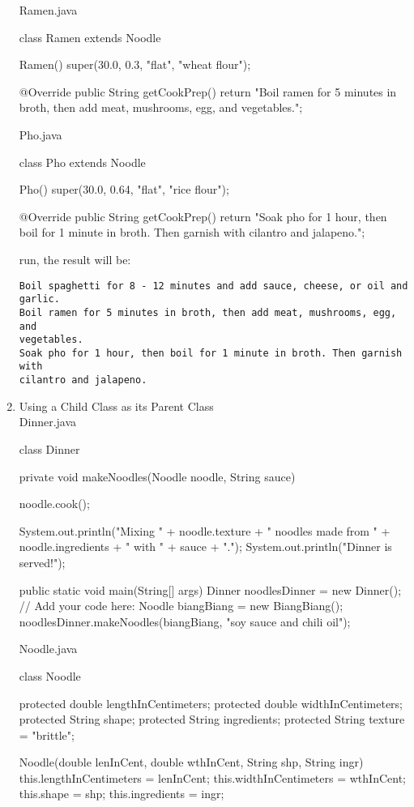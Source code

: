 \documentclass[a4paper,12pt]{article}
\begin{document}
\begin{enumerate}
Ramen.java
\begin{javacode}
class Ramen extends Noodle {  
  Ramen() {    
    super(30.0, 0.3, "flat", "wheat flour");    
  }
  
  @Override
  public String getCookPrep() {    
    return "Boil ramen for 5 minutes in broth, then add meat, mushrooms, egg, and vegetables.";    
  }  
}
\end{javacode}

Pho.java
\begin{javacode}
class Pho extends Noodle {  
  Pho() {    
    super(30.0, 0.64, "flat", "rice flour");    
  }
  
  @Override
  public String getCookPrep() {    
    return "Soak pho for 1 hour, then boil for 1 minute in broth. Then garnish with cilantro and jalapeno.";    
  }  
}
\end{javacode}
run, the result will be:
\begin{verbatim}
Boil spaghetti for 8 - 12 minutes and add sauce, cheese, or oil and garlic.
Boil ramen for 5 minutes in broth, then add meat, mushrooms, egg, and 
vegetables.
Soak pho for 1 hour, then boil for 1 minute in broth. Then garnish with 
cilantro and jalapeno.
\end{verbatim}

\item Using a Child Class as its Parent Class\\
Dinner.java
\begin{javacode}
class Dinner {  
  private void makeNoodles(Noodle noodle, String sauce) {    
    noodle.cook();
    
    System.out.println("Mixing " + noodle.texture + " noodles made from " + noodle.ingredients + " with " + sauce + ".");
    System.out.println("Dinner is served!");    
  }
  
  public static void main(String[] args) {    
    Dinner noodlesDinner = new Dinner();
    // Add your code here:
    Noodle biangBiang = new BiangBiang();
    noodlesDinner.makeNoodles(biangBiang, "soy sauce and chili oil");    
  }  
}
\end{javacode}

Noodle.java
\begin{javacode}
class Noodle {  
  protected double lengthInCentimeters;
  protected double widthInCentimeters;
  protected String shape;
  protected String ingredients;
  protected String texture = "brittle";
  
  Noodle(double lenInCent, double wthInCent, String shp, String ingr) {    
    this.lengthInCentimeters = lenInCent;
    this.widthInCentimeters = wthInCent;
    this.shape = shp;
    this.ingredients = ingr;    
  }
  
}
\end{javacode}
\end{enumerate}
\end{document}
